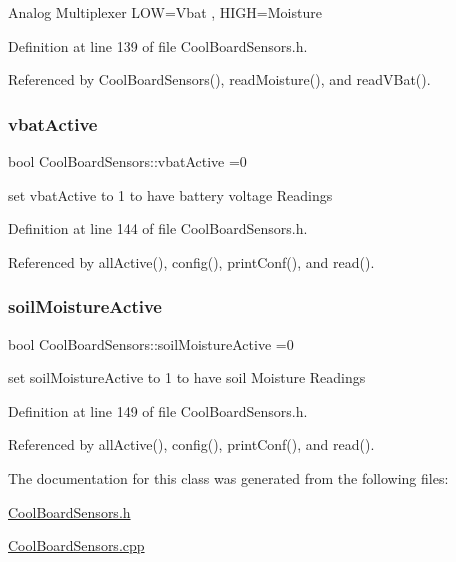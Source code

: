 Analog Multiplexer L\+OW=Vbat , H\+I\+GH=Moisture 

Definition at line 139 of file Cool\+Board\+Sensors.\+h.



Referenced by Cool\+Board\+Sensors(), read\+Moisture(), and read\+V\+Bat().

\mbox{\label{class_cool_board_sensors_ab0b4bbae83796b52b90f91008d383583}} 
\subsubsection{\texorpdfstring{vbat\+Active}{vbatActive}}
{\footnotesize\ttfamily bool Cool\+Board\+Sensors\+::vbat\+Active =0\hspace{0.3cm}{\ttfamily [private]}}

set vbat\+Active to 1 to have battery voltage Readings 

Definition at line 144 of file Cool\+Board\+Sensors.\+h.



Referenced by all\+Active(), config(), print\+Conf(), and read().

\mbox{\label{class_cool_board_sensors_ae7971bf527781ac4994309591b78ab89}} 
\subsubsection{\texorpdfstring{soil\+Moisture\+Active}{soilMoistureActive}}
{\footnotesize\ttfamily bool Cool\+Board\+Sensors\+::soil\+Moisture\+Active =0\hspace{0.3cm}{\ttfamily [private]}}

set soil\+Moisture\+Active to 1 to have soil Moisture Readings 

Definition at line 149 of file Cool\+Board\+Sensors.\+h.



Referenced by all\+Active(), config(), print\+Conf(), and read().



The documentation for this class was generated from the following files\+:\begin{DoxyCompactItemize}
\item 
\hyperlink{_cool_board_sensors_8h}{Cool\+Board\+Sensors.\+h}\item 
\hyperlink{_cool_board_sensors_8cpp}{Cool\+Board\+Sensors.\+cpp}\end{DoxyCompactItemize}
